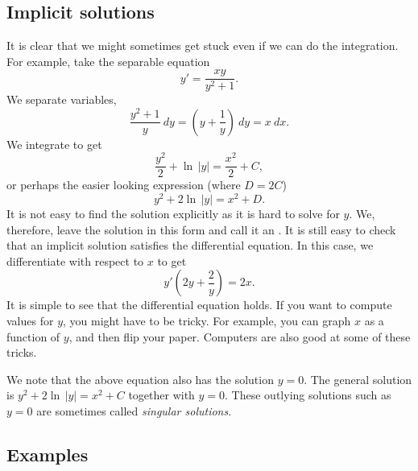\documentclass[12pt]{book}
\begin{document}
\subsection{Implicit solutions}

It is clear that we might sometimes get stuck even if we can do the
integration.  For example, take the separable equation
\begin{equation*}
y' = \frac{xy}{y^2+1} .
\end{equation*}
We separate variables,
\begin{equation*}
\frac{y^2+1}{y}~dy = \left(y+\frac{1}{y}\right)~dy = x~dx .
\end{equation*}
We integrate to get
\begin{equation*}
\frac{y^2}{2} + \ln \, \lvert y \rvert = \frac{x^2}{2} + C ,
\end{equation*}
or perhaps the easier looking expression (where $D = 2C$)
\begin{equation*}
y^2 + 2 \ln \, \lvert y\rvert = x^2 + D .
\end{equation*}
It is not easy to find the solution explicitly as it is hard to solve
for $y$.  We, therefore, leave the solution in this form and call
it an
\emph{}.
It is still
easy to check that an implicit solution satisfies the differential
equation.  In this case, we differentiate with respect to $x$
to get
\begin{equation*}
y'\left(2y + \frac{2}{y}\right) = 2x .
\end{equation*}
It is simple to see that the differential equation holds.
If you want to compute values
for $y$, you might have to be tricky.  For example, you can graph
$x$ as a function of $y$, and then flip your paper.  Computers are also good
at some of these tricks.

We note that the above equation also has the solution $y=0$.
The general solution is 
$y^2 + 2 \ln \, \lvert y \rvert = x^2 + C$ together with $y=0$.  These outlying solutions
such as $y=0$
are sometimes called \emph{singular solutions}.

\subsection{Examples}
\end{document}
